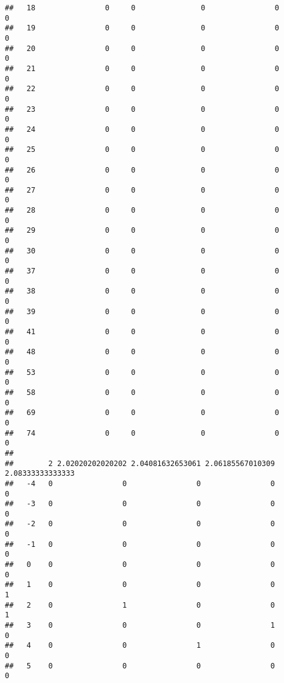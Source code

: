 \documentclass[]{article}
\begin{document}
\begin{verbatim}
##   18                0     0               0                0                0
##   19                0     0               0                0                0
##   20                0     0               0                0                0
##   21                0     0               0                0                0
##   22                0     0               0                0                0
##   23                0     0               0                0                0
##   24                0     0               0                0                0
##   25                0     0               0                0                0
##   26                0     0               0                0                0
##   27                0     0               0                0                0
##   28                0     0               0                0                0
##   29                0     0               0                0                0
##   30                0     0               0                0                0
##   37                0     0               0                0                0
##   38                0     0               0                0                0
##   39                0     0               0                0                0
##   41                0     0               0                0                0
##   48                0     0               0                0                0
##   53                0     0               0                0                0
##   58                0     0               0                0                0
##   69                0     0               0                0                0
##   74                0     0               0                0                0
##     
##        2 2.02020202020202 2.04081632653061 2.06185567010309 2.08333333333333
##   -4   0                0                0                0                0
##   -3   0                0                0                0                0
##   -2   0                0                0                0                0
##   -1   0                0                0                0                0
##   0    0                0                0                0                0
##   1    0                0                0                0                1
##   2    0                1                0                0                1
##   3    0                0                0                1                0
##   4    0                0                1                0                0
##   5    0                0                0                0                0

\end{verbatim}
\end{document}

